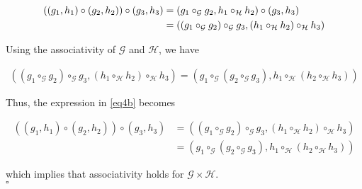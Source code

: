 \documentclass[../CryptoFinal.tex]{subfiles}
\begin{document}
\begin{flushleft}
\begin{align}
  \left( \left( g_1 , h_1 \right) \circ \left( g_2, h_2 \right) \right) \circ \left( g_3, h_3 \right) &= \left( g_1 \circ_\mathcal{G} g_2, h_1 \circ_\mathcal{H} h_2 \right) \circ \left( g_3, h_3 \right) \notag \\
  &= \left( \left(g_1 \circ_\mathcal{G} g_2\right) \circ_\mathcal{G} g_3, \left(h_1 \circ_\mathcal{H} h_2\right) \circ_\mathcal{H} h_3 \right) \label{eq4b}
\end{align}

Using the associativity of $\mathcal{G}$ and $\mathcal{H}$, we have

\begin{align*}
  \left( \left(g_1 \circ_\mathcal{G} g_2\right) \circ_\mathcal{G} g_3, \left(h_1 \circ_\mathcal{H} h_2\right) \circ_\mathcal{H} h_3 \right) = \left( g_1 \circ_\mathcal{G} \left(g_2 \circ_\mathcal{G} g_3\right), h_1 \circ_\mathcal{H} \left(h_2 \circ_\mathcal{H} h_3\right) \right)
\end{align*}

Thus, the expression in \ref{eq4b} becomes

\begin{align*}
  \left( \left( g_1 , h_1 \right) \circ \left( g_2, h_2 \right) \right) \circ \left( g_3, h_3 \right) &= \left( \left(g_1 \circ_\mathcal{G} g_2\right) \circ_\mathcal{G} g_3, \left(h_1 \circ_\mathcal{H} h_2\right) \circ_\mathcal{H} h_3 \right) \\
  &= \left( g_1 \circ_\mathcal{G} \left(g_2 \circ_\mathcal{G} g_3\right), h_1 \circ_\mathcal{H} \left(h_2 \circ_\mathcal{H} h_3\right) \right)
\end{align*}

which implies that associativity holds for $\mathcal{G} \times \mathcal{H}$. \\
$\square$



\end{flushleft}
\end{document}
